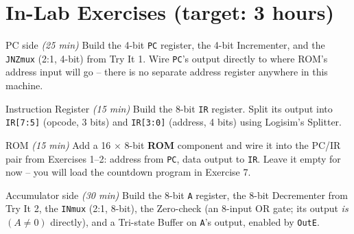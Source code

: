 \documentclass[11pt]{article}
\begin{document}
\section*{In-Lab Exercises (target: 3 hours)}

\begin{labexercise}{PC side \hfill {\small \itshape (25 min)}}
Build the 4-bit \texttt{PC} register, the 4-bit Incrementer, and the
\texttt{JNZmux} (2:1, 4-bit) from Try It 1. Wire \texttt{PC}'s output directly to
where ROM's address input will go -- there is no separate address register
anywhere in this machine.
\end{labexercise}

\begin{labexercise}{Instruction Register \hfill {\small \itshape (15 min)}}
Build the 8-bit \texttt{IR} register. Split its output into \texttt{IR[7:5]}
(opcode, 3 bits) and \texttt{IR[3:0]} (address, 4 bits) using Logisim's Splitter.
\end{labexercise}

\begin{labexercise}{ROM \hfill {\small \itshape (15 min)}}
Add a 16 $\times$ 8-bit \textbf{ROM} component and wire it into the PC/IR pair from
Exercises 1--2: address from \texttt{PC}, data output to \texttt{IR}. Leave it
empty for now -- you will load the countdown program in Exercise 7.
\end{labexercise}

\begin{labexercise}{Accumulator side \hfill {\small \itshape (30 min)}}
Build the 8-bit \texttt{A} register, the 8-bit Decrementer from Try It 2, the
\texttt{INmux} (2:1, 8-bit), the Zero-check (an 8-input OR gate; its output
\emph{is} $(A \neq 0)$ directly), and a Tri-state Buffer on \texttt{A}'s output,
enabled by \texttt{OutE}.
\end{labexercise}
\end{document}
